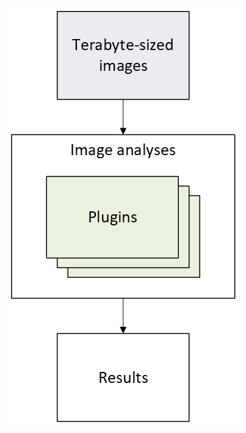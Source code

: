\begin{frame}
\begin{minipage}[h!]{0.35\textwidth}
    \includegraphics[scale=0.55]{./img/1_wipp.png}
  \end{minipage}
\end{frame}

\def\slidetitle{Plugin concept}

